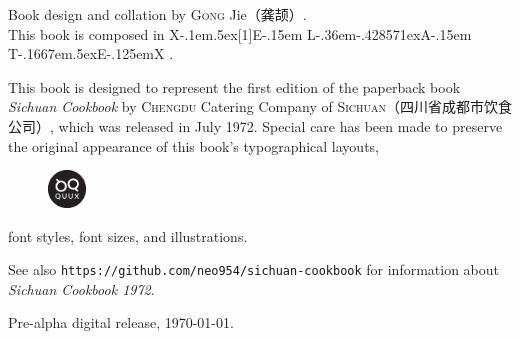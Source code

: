 Book design and collation by \textsc{Gong} Jie\!（龚颉）\!\!.\\
This book is composed in
\begingroup%
\rmfamily%
\footnotesize%
X\kern-.1em\lower.5ex\hbox{\scalebox{-1}[1]{E}}\kern-.15em%
L\kern-.36em\lower-.428571ex\hbox{\tiny{A}}\kern-.15em%
T\kern-.1667em\lower.5ex\hbox{E}\kern-.125emX%
\endgroup%
.

This book is designed to represent the first edition of the paperback book
\textit{Sichuan Cookbook}\!\! by \textsc{Chengdu}
Catering Company of \textsc{Sichuan}\!（四川省成都市饮食公司）\!\!, which was
released in July 1972. Special care has been made to preserve the original
appearance of this book's typographical layouts,
\begin{figure}%
\vspace{-1.25\baselineskip}%
\begin{flushright}%
\quad\includegraphics[height=10mm, width=10mm]{quux-logo.eps}%
\end{flushright}%
\vspace{-1.75\baselineskip}%
\end{figure}%
font styles, font sizes, and illustrations.

See also \texttt{https://github.com/neo954/sichuan-cookbook} for information
about \textit{Sichuan Cookbook 1972}\!\!.

Pre-alpha digital release, \today.

\endgroup%

